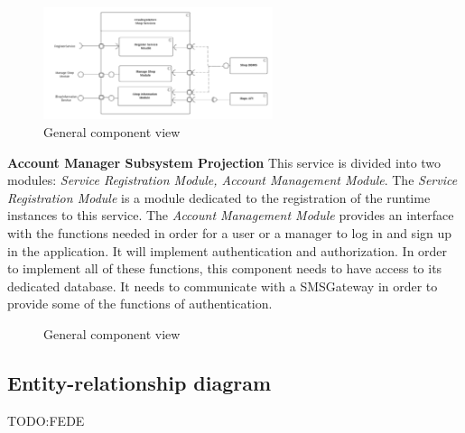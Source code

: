 \begin{figure}[h!]
    \centering
    \includegraphics[width=0.6\textwidth]{Images/ComponentViewShopServices.png}
    \caption{\label{fig:ComponentViewShopServices}{General component view}}
\end{figure}

\textbf{Account Manager Subsystem Projection}
This service is divided into two modules: \textit{Service Registration Module, Account Management Module}. 
The \textit{Service Registration Module} is a module dedicated to the registration of the runtime instances to this service.
The \textit{Account Management Module} provides an interface with the functions needed in order for a user or a manager to log in and sign up in the application. It will implement authentication and authorization. 
In order to implement all of these functions, this component needs to have access to its dedicated database. It needs to communicate with a SMSGateway in order to provide some of the functions of authentication. 

\begin{figure}[h!]
    \centering
    \caption{\label{fig:ComponentViewAccountManagerServices}{General component view}}
\end{figure}




\subsection{Entity-relationship diagram}
\label{subsect:entityrelationshipdiagram}

TODO:FEDE

